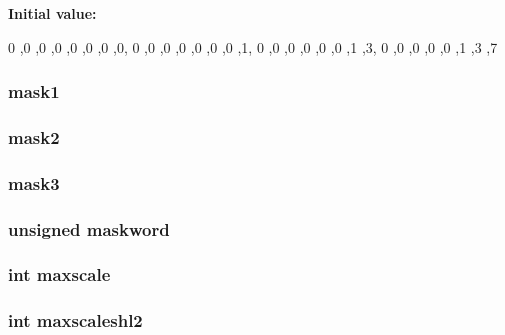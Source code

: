 \label{CONTIGSC_8C_ab39851371b2e506e131e50d79d8550d8}
{\bfseries Initial value:}
\begin{DoxyCode}
 {
{0 ,0 ,0 ,0 ,0 ,0 ,0 ,0},
{0 ,0 ,0 ,0 ,0 ,0 ,0 ,1},
{0 ,0 ,0 ,0 ,0 ,0 ,1 ,3},
{0 ,0 ,0 ,0 ,0 ,1 ,3 ,7} }
\end{DoxyCode}
\hypertarget{CONTIGSC_8C_a522ae19258cf30475ed90bb76819efb1}{
\subsubsection[{mask1}]{ {\bf mask1}}}
\label{CONTIGSC_8C_a522ae19258cf30475ed90bb76819efb1}
\hypertarget{CONTIGSC_8C_adadec9ebf5f6fe80150d567aa14fb9df}{
\subsubsection[{mask2}]{ {\bf mask2}}}
\label{CONTIGSC_8C_adadec9ebf5f6fe80150d567aa14fb9df}
\hypertarget{CONTIGSC_8C_a2cf11bafb2cecc45d9388a79b54483b7}{
\subsubsection[{mask3}]{ {\bf mask3}}}
\label{CONTIGSC_8C_a2cf11bafb2cecc45d9388a79b54483b7}
\hypertarget{CONTIGSC_8C_a6ccb606fa584e073646279771b40a0ee}{
\subsubsection[{maskword}]{\setlength{\rightskip}{0pt plus 5cm}unsigned {\bf maskword}}}
\label{CONTIGSC_8C_a6ccb606fa584e073646279771b40a0ee}
\hypertarget{CONTIGSC_8C_a4531e3adda9a00231c5fc8b7a4644398}{
\subsubsection[{maxscale}]{\setlength{\rightskip}{0pt plus 5cm}int {\bf maxscale}}}
\label{CONTIGSC_8C_a4531e3adda9a00231c5fc8b7a4644398}
\hypertarget{CONTIGSC_8C_ac10b61c2a588ba00d9ecda54429e0a9d}{
\subsubsection[{maxscaleshl2}]{\setlength{\rightskip}{0pt plus 5cm}int {\bf maxscaleshl2}}}
